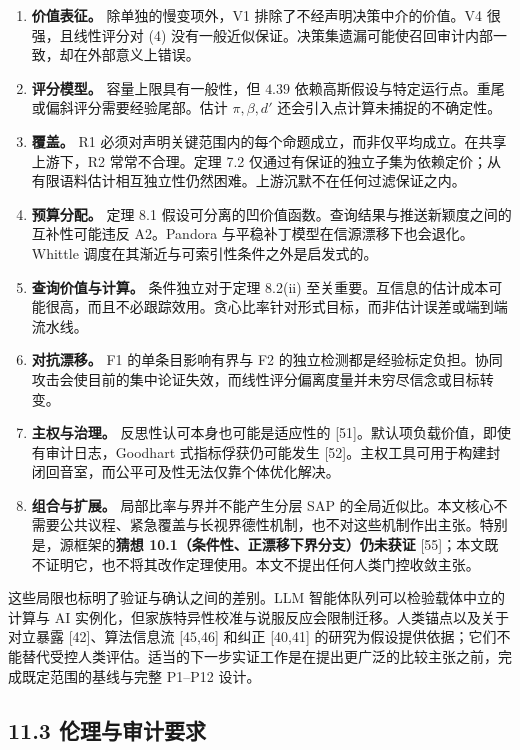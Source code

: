 \documentclass[
  chinese,
  11pt]{article}
\providecommand{\tightlist}{%
  \setlength{\itemsep}{0pt}\setlength{\parskip}{0pt}}
\begin{document}
\begin{enumerate}
\def\labelenumi{\arabic{enumi}.}
\tightlist
\item
  \textbf{价值表征。} 除单独的慢变项外，V1 排除了不经声明决策中介的价值。V4 很强，且线性评分对 (4) 没有一般近似保证。决策集遗漏可能使召回审计内部一致，却在外部意义上错误。
\item
  \textbf{评分模型。} 容量上限具有一般性，但 \(4.39\) 依赖高斯假设与特定运行点。重尾或偏斜评分需要经验尾部。估计 \(\pi,\beta,d'\) 还会引入点计算未捕捉的不确定性。
\item
  \textbf{覆盖。} R1 必须对声明关键范围内的每个命题成立，而非仅平均成立。在共享上游下，R2 常常不合理。定理 7.2 仅通过有保证的独立子集为依赖定价；从有限语料估计相互独立性仍然困难。上游沉默不在任何过滤保证之内。
\item
  \textbf{预算分配。} 定理 8.1 假设可分离的凹价值函数。查询结果与推送新颖度之间的互补性可能违反 A2。Pandora 与平稳补丁模型在信源漂移下也会退化。Whittle 调度在其渐近与可索引性条件之外是启发式的。
\item
  \textbf{查询价值与计算。} 条件独立对于定理 8.2(ii) 至关重要。互信息的估计成本可能很高，而且不必跟踪效用。贪心比率针对形式目标，而非估计误差或端到端流水线。
\item
  \textbf{对抗漂移。} F1 的单条目影响有界与 F2 的独立检测都是经验标定负担。协同攻击会使目前的集中论证失效，而线性评分偏离度量并未穷尽信念或目标转变。
\item
  \textbf{主权与治理。} 反思性认可本身也可能是适应性的 {[}51{]}。默认项负载价值，即使有审计日志，Goodhart 式指标俘获仍可能发生 {[}52{]}。主权工具可用于构建封闭回音室，而公平可及性无法仅靠个体优化解决。
\item
  \textbf{组合与扩展。} 局部比率与界并不能产生分层 SAP 的全局近似比。本文核心不需要公共议程、紧急覆盖与长视界德性机制，也不对这些机制作出主张。特别是，源框架的\textbf{猜想 10.1（条件性、正漂移下界分支）仍未获证} {[}55{]}；本文既不证明它，也不将其改作定理使用。本文不提出任何人类门控收敛主张。
\end{enumerate}

这些局限也标明了验证与确认之间的差别。LLM 智能体队列可以检验载体中立的计算与 AI 实例化，但家族特异性校准与说服反应会限制迁移。人类锚点以及关于对立暴露 {[}42{]}、算法信息流 {[}45,46{]} 和纠正 {[}40,41{]} 的研究为假设提供依据；它们不能替代受控人类评估。适当的下一步实证工作是在提出更广泛的比较主张之前，完成既定范围的基线与完整 P1--P12 设计。

\subsection{11.3 伦理与审计要求}\label{ux4f26ux7406ux4e0eux5ba1ux8ba1ux8981ux6c42}
\end{document}
